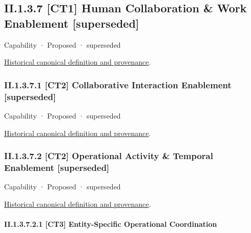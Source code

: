 \subsection*{II.1.3.7 [CT1] Human Collaboration \& Work Enablement [superseded]}
\label{navigation:II.1.3.7}

\label{element:c9347f73b21242c5b8cce41252b74da0}
{\small Capability · Proposed · superseded}\par
\href{../../../../../../../continuum/strategy/capability/c9347f73b21242c5b8cce41252b74da0.md}{Historical canonical definition and provenance}.\par
\subsubsection*{II.1.3.7.1 [CT2] Collaborative Interaction Enablement [superseded]}
\label{navigation:II.1.3.7.1}

\label{element:6140b21c874241d092708e2411caceed}
{\small Capability · Proposed · superseded}\par
\href{../../../../../../../continuum/strategy/capability/6140b21c874241d092708e2411caceed.md}{Historical canonical definition and provenance}.\par
\subsubsection*{II.1.3.7.2 [CT2] Operational Activity \& Temporal Enablement [superseded]}
\label{navigation:II.1.3.7.2}

\label{element:ca96b2b2ff434854995711e403e95f6f}
{\small Capability · Proposed · superseded}\par
\href{../../../../../../../continuum/strategy/capability/ca96b2b2ff434854995711e403e95f6f.md}{Historical canonical definition and provenance}.\par
\paragraph*{II.1.3.7.2.1 [CT3] Entity-Specific Operational Coordination}
\label{navigation:II.1.3.7.2.1}

